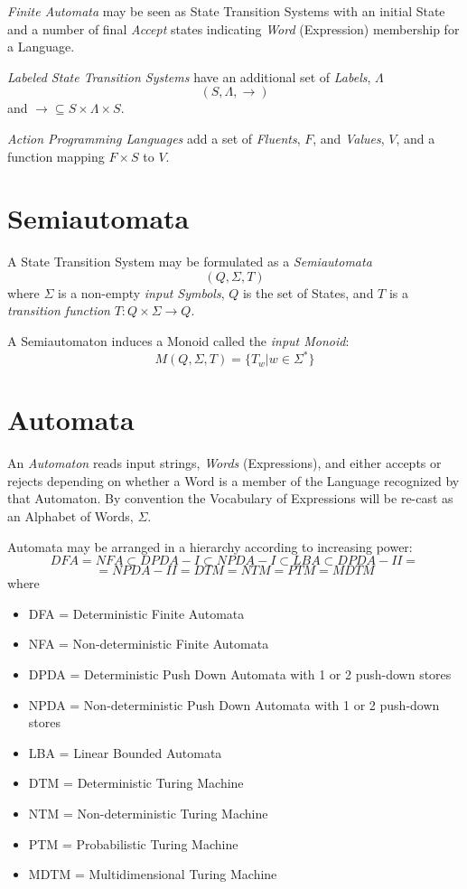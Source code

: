 \documentclass{article}
\begin{document}
\emph{Finite Automata} may be seen as State Transition Systems with an
initial State and a number of final \emph{Accept} states indicating
\emph{Word} (Expression) membership for a Language.

\emph{Labeled State Transition Systems} have an additional set of
\emph{Labels}, $\Lambda$
\[(S,\Lambda,\rightarrow)\]
and $\rightarrow \subseteq S \times \Lambda \times S$.

\emph{Action Programming Languages} add a set of \emph{Fluents}, $F$, and
\emph{Values}, $V$, and a function mapping $F \times S$ to $V$.

\section{Semiautomata}

A State Transition System may be formulated as a \emph{Semiautomata}
\[
    (Q,\Sigma,T)
\]
where $\Sigma$ is a non-empty \emph{input Symbols}, $Q$ is the set of
States, and $T$ is a \emph{transition function} $T:Q \times \Sigma
\rightarrow Q$.

A Semiautomaton induces a Monoid called the \emph{input Monoid}:
\[
    M(Q,\Sigma,T) = \{T_w | w \in \Sigma^*\}
\]



\section{Automata} \label{subsec:automata}

An \emph{Automaton} reads input strings, \emph{Words} (Expressions),
and either accepts or rejects depending on whether a Word is a member
of the Language recognized by that Automaton. By convention the
Vocabulary of Expressions will be re-cast as an Alphabet of Words,
$\Sigma$.

Automata may be arranged in a hierarchy according to increasing power:
\[
    DFA = NFA \subset DPDA-I \subset NPDA-I \subset LBA \subset DPDA-II =
\]\[
    = NPDA-II = DTM = NTM = PTM = MDTM
\]
where
\begin{itemize}
\item DFA = Deterministic Finite Automata
\item NFA = Non-deterministic Finite Automata
\item DPDA = Deterministic Push Down Automata with 1
  or 2 push-down stores
\item NPDA = Non-deterministic Push Down Automata
  with 1 or 2 push-down stores
\item LBA = Linear Bounded Automata
\item DTM = Deterministic Turing Machine
\item NTM = Non-deterministic Turing Machine
\item PTM = Probabilistic Turing Machine
\item MDTM = Multidimensional Turing Machine
\end{itemize}
\end{document}

